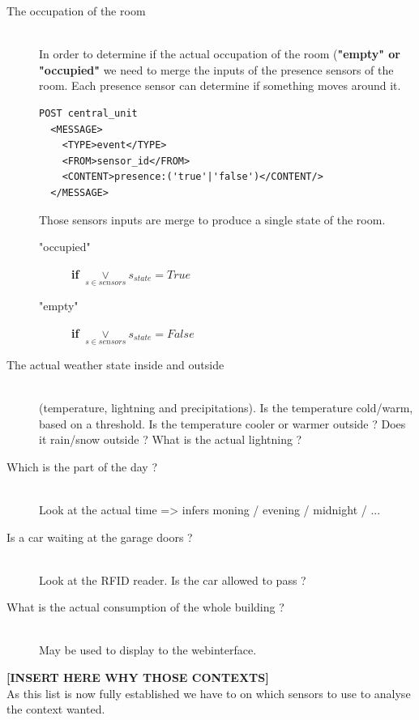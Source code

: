 \documentclass{acm_proc_article-sp}
\begin{document}
\begin{description}
 \item[The occupation of the room]\hfill \\ 
 In order to determine if the actual occupation of the room (\textbf{"empty" or "occupied"} we need to merge the inputs of the presence sensors of the room.
 Each presence sensor can determine if something moves around it.
 \begin{verbatim}
POST central_unit 
  <MESSAGE>
    <TYPE>event</TYPE>
    <FROM>sensor_id</FROM>
    <CONTENT>presence:('true'|'false')</CONTENT/>
  </MESSAGE> 
\end{verbatim}
Those sensors inputs are merge to produce a single state of the room.
\begin{description}
  \item["occupied"] \textbf{if} $\underset{s \in sensors}{\lor} s_{state} =  True$
  \item["empty"] \textbf{if} $\underset{s \in sensors}{\lor} s_{state} =  False$
 \end{description}
 \item[The actual weather state inside and outside]\hfill \\
 (temperature, lightning and precipitations). 
 Is the temperature cold/warm, based on a threshold. Is the temperature cooler or warmer outside ? 
 Does it rain/snow outside ? What is the actual lightning ?
 \item[Which is the part of the day ?] \hfill \\
 Look at the actual time => infers moning / evening / midnight / ...
 \item[Is a car waiting at the garage doors ?] \hfill \\
  Look at the RFID reader. Is the car allowed to pass ?
 \item[What is the actual consumption of the whole building ?]\hfill \\
 May be used to display to the webinterface.
\end{description}
\textbf{[INSERT HERE WHY THOSE CONTEXTS]}\\
As this list is now fully established we have to on which sensors to use to analyse the context wanted.
\end{document}
